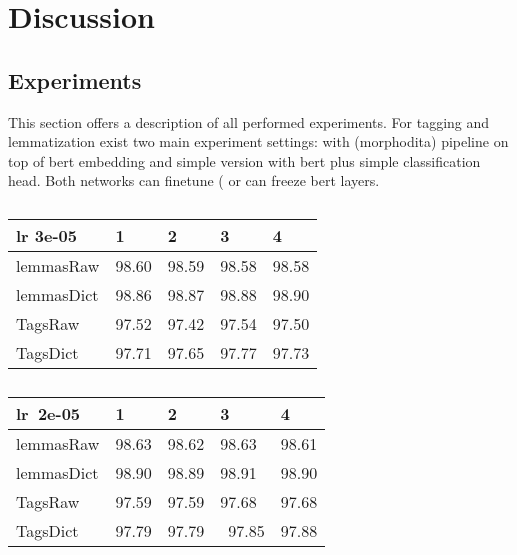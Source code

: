 \chapter{Discussion}
\label{chap:diss}


\section{Experiments}
This section offers a description of all performed experiments.
For tagging and lemmatization exist two main experiment settings: with (morphodita) pipeline on top of bert embedding and simple version with bert plus simple classification head. Both networks can finetune ( %
or can freeze bert layers.









\begin{table}
\centering
\caption{}
\begin{tabular}{l|llll}
\multicolumn{1}{l}{\textbf{lr 3e-05}} & 1     & 2      & 3     & 4      \\ 
\hline\hline
lemmasRaw                    & 98.60 & 98.59  & 98.58 & 98.58  \\ 
\hline
lemmasDict                   & 98.86 & 98.87  & 98.88 & 98.90  \\ 
\hline
TagsRaw                      & 97.52 & 97.42 & 97.54 & 97.50  \\ 
\hline
TagsDict                     & 97.71 & 97.65  & 97.77 & 97.73  \\
\hline
\end{tabular}
\end{table}

\begin{table}
\centering
\caption{}
\begin{tabular}{l|llll}
\multicolumn{1}{l}{\textbf{lr~2e-05}} & 1     & 2     & 3      & 4      \\ 
\hline\hline
lemmasRaw                    & 98.63 & 98.62 & 98.63  & 98.61  \\ 
\hline
lemmasDict                   & 98.90 & 98.89 & 98.91  & 98.90  \\ 
\hline
TagsRaw                      & 97.59 & 97.59 & 97.68  & 97.68  \\ 
\hline
TagsDict                     & 97.79 & 97.79 & ~97.85 & 97.88  \\
\hline
\end{tabular}
\end{table}

